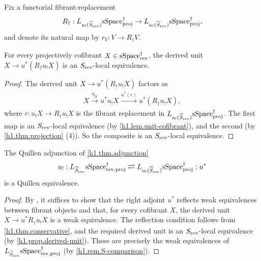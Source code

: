 \documentclass[a4paper,dvipdfmx,11pt]{amsart}
\begin{document}
\begin{notation}
  Fix a functorial fibrant-replacement
  \begin{align}
    R_{\dag}:
    L_{u_{!}(\widetilde S_{\mathrm{rev}})}\mathrm{sSpace}^{\dag}_{\mathrm{proj}}
    \to
    L_{u_{!}(\widetilde S_{\mathrm{rev}})}\mathrm{sSpace}^{\dag}_{\mathrm{proj}},
  \end{align}
  and denote its natural map by $r_V:V\to R_{\dag}V$.
\end{notation}

\begin{proposition}\label{h1.prop.derived-unit}
  For every projectively cofibrant $X\in\mathrm{sSpace}^{\dag}_{\mathrm{rev}}$, the derived unit $X\to u^{*}(R_{\dag}u_{!}X)$ is an $S_{\mathrm{rev}}$-local equivalence.
\end{proposition}

\begin{proof}
  The derived unit $X\to u^{*}(R_{\dag}u_{!}X)$ factors as 
  \begin{align}
    X\xrightarrow{\eta_X}u^{*}u_{!}X\xrightarrow{u^{*}(r)}u^{*}(R_{\dag}u_{!}X),
  \end{align}
  where $r:u_{!}X\to R_{\dag}u_{!}X$ is the fibrant replacement in $L_{u_{!}(\widetilde S_{\mathrm{rev}})}\mathrm{sSpace}^{\dag}_{\mathrm{proj}}$.
  The first map is an $S_{\mathrm{rev}}$-local equivalence (by \cref{h1.lem.unit-cofibrant}), and the second (by \cref{h1.thm.projection} (4)).
  So the composite is an $S_{\mathrm{rev}}$-local equivalence.
\end{proof}

\begin{theorem} \label{h1.thm.main}
  The Quillen adjunction of \cref{h1.thm.adjunction}
  \begin{align}
    u_{!}:
    L_{\widetilde S_{\mathrm{rev}}}\mathrm{sSpace}^{\dag}_{\mathrm{rev},\mathrm{proj}}
    \rightleftarrows
    L_{u_{!}(\widetilde S_{\mathrm{rev}})}\mathrm{sSpace}^{\dag}_{\mathrm{proj}}
    :u^{*}
  \end{align}
  is a Quillen equivalence.
\end{theorem}

\begin{proof}
  By \cite[Corollary 1.3.16]{Hov99}, it suffices to show that the right adjoint $u^{*}$ reflects weak equivalences between fibrant objects and that, for every cofibrant $X$, the derived unit $X\to u^{*}R_{\dag}u_{!}X$ is a weak equivalence.
  The reflection condition follows from \cref{h1.thm.conservative}, and the required derived unit is an $S_{\mathrm{rev}}$-local equivalence (by \cref{h1.prop.derived-unit}).  
  These are precisely the weak equivalences of $L_{\widetilde S_{\mathrm{rev}}}\mathrm{sSpace}^{\dag}_{\mathrm{rev},\mathrm{proj}}$ (by \cref{h1.rem.S-comparison}).
\end{proof}
\end{document}
